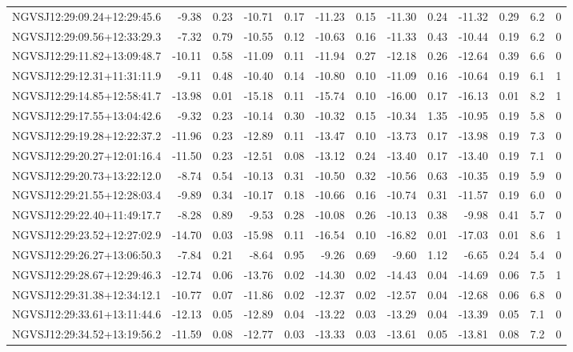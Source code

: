 \begin{tabular}{lrrrrrrrrrrcc}
NGVSJ12:29:09.24+12:29:45.6 & -9.38 & 0.23 & -10.71 & 0.17 & -11.23 & 0.15 & -11.30 & 0.24 & -11.32 & 0.29 & 6.2 & 0 \\
NGVSJ12:29:09.56+12:33:29.3 & -7.32 & 0.79 & -10.55 & 0.12 & -10.63 & 0.16 & -11.33 & 0.43 & -10.44 & 0.19 & 6.2 & 0 \\
NGVSJ12:29:11.82+13:09:48.7 & -10.11 & 0.58 & -11.09 & 0.11 & -11.94 & 0.27 & -12.18 & 0.26 & -12.64 & 0.39 & 6.6 & 0 \\
NGVSJ12:29:12.31+11:31:11.9 & -9.11 & 0.48 & -10.40 & 0.14 & -10.80 & 0.10 & -11.09 & 0.16 & -10.64 & 0.19 & 6.1 & 1 \\
NGVSJ12:29:14.85+12:58:41.7 & -13.98 & 0.01 & -15.18 & 0.11 & -15.74 & 0.10 & -16.00 & 0.17 & -16.13 & 0.01 & 8.2 & 1 \\
NGVSJ12:29:17.55+13:04:42.6 & -9.32 & 0.23 & -10.14 & 0.30 & -10.32 & 0.15 & -10.34 & 1.35 & -10.95 & 0.19 & 5.8 & 0 \\
NGVSJ12:29:19.28+12:22:37.2 & -11.96 & 0.23 & -12.89 & 0.11 & -13.47 & 0.10 & -13.73 & 0.17 & -13.98 & 0.19 & 7.3 & 0 \\
NGVSJ12:29:20.27+12:01:16.4 & -11.50 & 0.23 & -12.51 & 0.08 & -13.12 & 0.24 & -13.40 & 0.17 & -13.40 & 0.19 & 7.1 & 0 \\
NGVSJ12:29:20.73+13:22:12.0 & -8.74 & 0.54 & -10.13 & 0.31 & -10.50 & 0.32 & -10.56 & 0.63 & -10.35 & 0.19 & 5.9 & 0 \\
NGVSJ12:29:21.55+12:28:03.4 & -9.89 & 0.34 & -10.17 & 0.18 & -10.66 & 0.16 & -10.74 & 0.31 & -11.57 & 0.19 & 6.0 & 0 \\
NGVSJ12:29:22.40+11:49:17.7 & -8.28 & 0.89 & -9.53 & 0.28 & -10.08 & 0.26 & -10.13 & 0.38 & -9.98 & 0.41 & 5.7 & 0 \\
NGVSJ12:29:23.52+12:27:02.9 & -14.70 & 0.03 & -15.98 & 0.11 & -16.54 & 0.10 & -16.82 & 0.01 & -17.03 & 0.01 & 8.6 & 1 \\
NGVSJ12:29:26.27+13:06:50.3 & -7.84 & 0.21 & -8.64 & 0.95 & -9.26 & 0.69 & -9.60 & 1.12 & -6.65 & 0.24 & 5.4 & 0 \\
NGVSJ12:29:28.67+12:29:46.3 & -12.74 & 0.06 & -13.76 & 0.02 & -14.30 & 0.02 & -14.43 & 0.04 & -14.69 & 0.06 & 7.5 & 1 \\
NGVSJ12:29:31.38+12:34:12.1 & -10.77 & 0.07 & -11.86 & 0.02 & -12.37 & 0.02 & -12.57 & 0.04 & -12.68 & 0.06 & 6.8 & 0 \\
NGVSJ12:29:33.61+13:11:44.6 & -12.13 & 0.05 & -12.89 & 0.04 & -13.22 & 0.03 & -13.29 & 0.04 & -13.39 & 0.05 & 7.1 & 0 \\
NGVSJ12:29:34.52+13:19:56.2 & -11.59 & 0.08 & -12.77 & 0.03 & -13.33 & 0.03 & -13.61 & 0.05 & -13.81 & 0.08 & 7.2 & 0 \\

\end{tabular}
